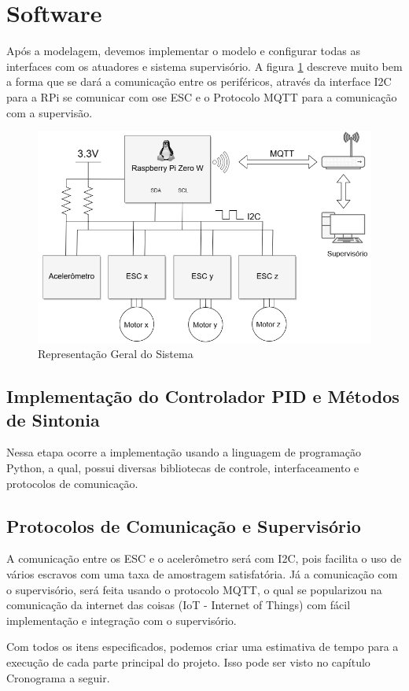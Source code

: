 \section{Software}

Após a modelagem, devemos implementar o modelo e configurar todas as interfaces com os atuadores e sistema supervisório. A figura \ref{fig:comunicacao_projeto} descreve muito bem a forma que se dará a comunicação entre os periféricos, através da interface I2C para a RPi se comunicar com ose ESC e o Protocolo MQTT para a comunicação com a supervisão.


\begin{figure}[H]
  \caption{Representação Geral do Sistema}
  \begin{center}
      \includegraphics[scale=.75]{metodologia/img/comunicacao_projeto}
  \end{center}
  \label{fig:comunicacao_projeto}
\end{figure}

\subsection{Implementação do Controlador PID e Métodos de Sintonia}

Nessa etapa ocorre a implementação usando a linguagem de programação Python, a qual, possui diversas bibliotecas de controle, interfaceamento e protocolos de comunicação. 

\subsection{Protocolos de Comunicação e Supervisório}

A comunicação entre os ESC e o acelerômetro será com I2C, pois facilita o uso de vários escravos com uma taxa de amostragem satisfatória. Já a comunicação com o supervisório, será feita usando o protocolo MQTT, o qual se popularizou na comunicação da internet das coisas (IoT - Internet of Things) com fácil implementação e integração com o supervisório.

Com todos os itens especificados, podemos criar uma estimativa de tempo para a execução de cada parte principal do projeto. Isso pode ser visto no capítulo Cronograma a seguir.
